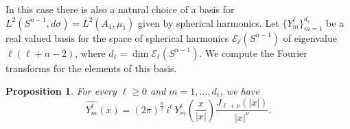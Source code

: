 \documentclass[11pt,reqno]{amsart}
\newtheorem{proposition}[theorem]{Proposition}
\theoremstyle{definition}
\begin{document}
 In this case there is also a natural choice of a basis for $L^2(S^{n-1},d\sigma)=L^2(A_1, \mu_1)$ given by spherical harmonics.  Let $\{Y^\ell_m\}_{m=1}^{d_\ell}$ be a real valued basis for the space of spherical harmonics  $\mathcal E_\ell(S^{n-1})$ of eigenvalue $\ell(\ell+n-2)$, where $d_\ell=\dim \mathcal E_\ell(S^{n-1})$. 
We compute the Fourier transforms for the elements of this basis.
\begin{proposition} For every  $\ell \geq 0$ and $m=1, \dots, d_\ell$, we have 
\begin{equation}\label{E: f.t.  harmonic}
 \widehat{Y^\ell_m}(x)=(2\pi)^{\frac{n}{2}}\,i^\ell\, Y^\ell_m \left(\frac{x}{|x|}\right) \frac{J_{\ell + \nu}(|x|)}{|x|^{\nu}}.
\end{equation}
\end{proposition}
\end{document}
